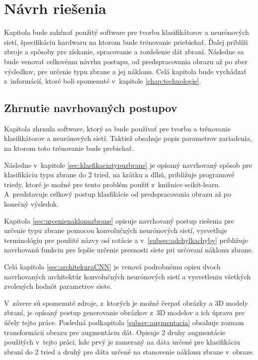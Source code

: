 \chapter{Návrh riešenia}
Kapitola bude zahŕnať použitý software pre tvorbu klasifikátorov a neurónových sietí, špecifikáciu hardwaru na ktorom bude trénovanie priebiehať.
Ďalej priblíži zbroje a spôsoby pre získanie, spracovanie a rozdelenie dát zbraní.
Následne sa bude venovať celkovému návrhu postupu, od predspracovania obrazu až po zber výsledkov, pre určenie typu zbrane a jej náklonu.
Celá kapitola bude vychádzať z~informácií, ktoré boli spomenuté v~kapitole \ref{chap:technologie}.













\section{Zhrnutie navrhovaných postupov}

Kapitola zhrnula software, ktorý sa bude používať pre tvorbu a trénovanie klasifikátorov a neurónových sietí.
Taktiež obsahuje popis parametrov zariadenia, na ktorom toto trénovanie bude prebiehať.

Následne v~kapitole \ref{sec:klasfikaciatypuzbrane} je opísaný navrhovaný spôsob pre klasifikáciu typu zbrane do 2 tried, na krátku a dlhú, približuje
    programové triedy, ktoré je možné pre tento problém použiť z~knižnice scikit-learn.
A~predstavuje celkový postup klasfikácie od predspracovania obrazu až po konečný výsledok.

Kapitola \ref{sec:urcenienaklonuzbrane} opisuje navrhovaný postup riešenia pre určenie typu zbrane pomocou konvolučných neurónových sietí,
    vysvetľuje terminológiu pre použité názvy osí rotácie a v~\ref{subsec:odchylkachyby} približuje navrhovanú funkciu pre lepšie určenie presnosti siete
    pri určovaní náklonu zbrane.

Celá kapitola \ref{sec:architekuraCNN} je venová podrobnému opisu dvoch navrhovaných architektúr konvolučných neurónových sietí a
    vysvetleniu všetkých zvolených hodnôt parametrov siete.

V~závere sú spomenuté zdroje, z~ktorých je možné čerpať obrázky a 3D modely zbraní, je opísaný postup generovanie obrázkov z~3D modelov a ich úprava
    pre účely tejto práce.
Posledná podkapitola \ref{subsec:augmentacia} obsahuje zoznam transformácii obrazu pre augmentáciu dát.
Opisuje 2 druhy augmentácie použitých v~tejto práci, kde prvý je zameraný na dáta určené pre klasifikáciu zbraní do 2 tried a druhý pre dáta
    určené na stanovenie náklonu zbrane v~obraze.

